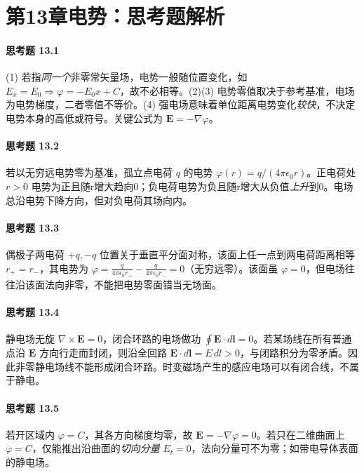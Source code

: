 \section*{第13章\quad 电势：思考题解析}
\paragraph{思考题 13.1}
(1) 若指\emph{同一个}非零常矢量场，电势一般随位置变化，如 \(E_x=E_0\Rightarrow\varphi=-E_0x+C\)，故不必相等。(2)(3) 电势零值取决于参考基准，电场为电势梯度，二者零值不等价。(4) 强电场意味着单位距离电势变化\emph{较快}，不决定电势本身的高低或符号。关键公式为 \(\boxed{\boldsymbol E=-\nabla\varphi}\)。

\paragraph{思考题 13.2}
若以无穷远电势零为基准，孤立点电荷 \(q\) 的电势 \(\varphi(r)=q/(4\pi\epsilon_0r)\)。正电荷处 \(r>0\) 电势为正且随r增大趋向0；负电荷电势为负且随r增大从负值\emph{上升}到0。电场总沿电势下降方向，但对负电荷其场向内。

\paragraph{思考题 13.3}
偶极子两电荷 \(+q,-q\) 位置关于垂直平分面对称，该面上任一点到两电荷距离相等 \(r_+=r_-\)，其电势为 \(\varphi=\frac{q}{4\pi\epsilon_0r_+}-\frac{q}{4\pi\epsilon_0r_-}=0\)（无穷远零）。该面虽 \(\varphi=0\)，但电场往往沿该面法向非零，不能把电势零面错当无场面。

\paragraph{思考题 13.4}
静电场无旋 \(\nabla\times\boldsymbol E=0\)，闭合环路的电场做功 \(\oint\boldsymbol E\cdot d\boldsymbol l=0\)。若某场线在所有普通点沿 \(\boldsymbol E\) 方向行走而封闭，则沿全回路 \(\boldsymbol E\cdot d\boldsymbol l=E\,dl>0\)，与闭路积分为零矛盾。因此非零静电场线不能形成闭合环路。时变磁场产生的感应电场可以有闭合线，不属于静电。

\paragraph{思考题 13.5}
若开区域内 \(\varphi=C\)，其各方向梯度均零，故 \(\boldsymbol E=-\nabla\varphi=0\)。若只在二维曲面上 \(\varphi=C\)，仅能推出沿曲面的\emph{切向分量} \(E_t=0\)，法向分量可不为零；如带电导体表面的静电场。

